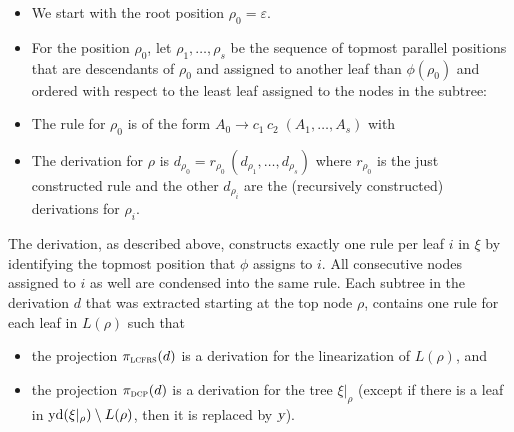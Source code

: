 \documentclass[../../document.tex]{subfiles}
\begin{document}
    \begin{itemize}
        \item We start with the root position \(\rho_0 = \varepsilon\).
        \item For the position \(\rho_0\), let \(\rho_1, \ldots, \rho_s\) be the sequence of topmost parallel positions that are descendants of \(\rho_0\) and assigned to another leaf than \(\phi(\rho_0)\) and ordered with respect to the least leaf assigned to the nodes in the subtree:
        \item The rule for \(\rho_0\) is of the form \(A_0 \to c_1 \, c_2\; (A_1, \ldots, A_s)\) with
        \item The derivation for \(\rho\) is \(d_{\rho_0} = r_{\rho_0}\,(d_{\rho_1}, \ldots, d_{\rho_s})\) where \(r_{\rho_0}\) is the just constructed rule and the other \(d_{\rho_i}\) are the (recursively constructed) derivations for \(\rho_i\).
    \end{itemize}

    The derivation, as described above, constructs exactly one rule per leaf \(i\) in \(\xi\) by identifying the topmost position that \(\phi\) assigns to \(i\).
    All consecutive nodes assigned to \(i\) as well are condensed into the same rule.
    Each subtree in the derivation \(d\) that was extracted starting at the top node \(\rho\), contains one rule for each leaf in \(L(\rho)\) such that
    \begin{itemize}
        \item the  projection \(\pi_{\textsc{lcfrs}}(d)\) is a derivation for the linearization of \(L(\rho)\), and
        \item the  projection \(\pi_{\textsc{dcp}}(d)\) is a derivation for the tree \(\xi|_\rho\) (except if there is a leaf in \(\operatorname{yd}(\xi|_\rho) \setminus L(\rho)\), then it is replaced by \(\textsl{y}\)).
    \end{itemize}
\end{document}

